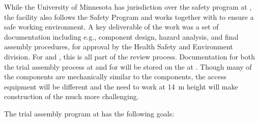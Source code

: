 While the University of Minnesota has jurisdiction over the safety program at , the facility also follows the  Safety Program and works together with  to ensure a safe working environment.  
A key deliverable of the  work was a set of documentation including e.g.,   
component design,  hazard analysis, and final assembly procedures, for approval by the  Health Safety and Environment division. 
For   and , this is all part of the  review process. 
Documentation for both the trial assembly process at   and for  will be stored on the  at . 
Though many of the  components are mechanically similar to the  components, the access equipment will be different and the need to work at \SI{14}{m} height will make construction of the  much more challenging.  


The   trial assembly program at  has the following goals:

